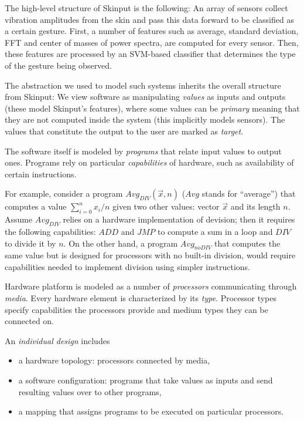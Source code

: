 \documentclass[conference]{IEEEtran}
\begin{document}
The high-level structure of Skinput is the following: An array of sensors collect vibration amplitudes from the skin and pass this data forward to be classified as a certain gesture. First, a number of features such as average, standard deviation, FFT and center of masses of power spectra, are computed for every sensor. Then, these features are processed by an \mbox{SVM-based} classifier that determines the type of the gesture being observed.

The abstraction we used to model such systems inherits the overall structure from Skinput: We view software as manipulating \emph{values} as inputs and outputs (these model Skinput's features), where some values can be \emph{primary} meaning that they are not computed inside the system (this implicitly models sensors). The values that constitute the output to the user are marked as \emph{target}. 

The software itself is modeled by \emph{programs} that relate input values to output ones. Programs rely on particular \emph{capabilities} of hardware, such as availability of certain instructions.

For example, consider a program $Avg_{DIV}(\overrightarrow{x}, n)$ ($Avg$ stands for ``average'') that computes a value $\sum\limits_{i=0}^n x_i / n$ given two other values: vector $\overrightarrow{x}$ and its length $n$. Assume $Avg_{DIV}$ relies on a hardware implementation of devision; then it requires the following capabilities: $ADD$ and $JMP$ to compute a sum in a loop and $DIV$ to divide it by $n$. On the other hand, a program $Avg_{noDIV}$ that computes the same value but is designed for processors with no built-in division, would require capabilities needed to implement division using simpler instructions.

Hardware platform is modeled as a number of \emph{processors} communicating through \emph{media}. Every hardware element is characterized by its \emph{type}. Processor types specify capabilities the processors provide and medium types they can be connected on.

An \emph{individual design} includes 
\begin{itemize}
\item a hardware topology: processors connected by media,
\item a software configuration: programs that take values as inputs and send resulting values over to other programs,
\item a mapping that assigns programs to be executed on particular processors.
\end{itemize}
\end{document}
